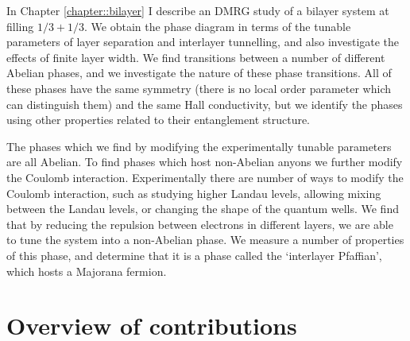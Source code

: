 In Chapter \ref{chapter::bilayer} I describe an DMRG study of a bilayer system at filling $1/3+1/3$. We obtain the phase diagram in terms of the tunable parameters of layer separation and interlayer tunnelling, and also investigate the effects of finite layer width. We find transitions between a number of different Abelian phases, and we investigate the nature of these phase transitions. All of these phases have the same symmetry (there is no local order parameter which can distinguish them) and the same Hall conductivity, but we identify the phases using other properties related to their entanglement structure.

The phases which we find by modifying the experimentally tunable parameters are all Abelian. To find phases which host non-Abelian anyons we further modify the Coulomb interaction. Experimentally there are number of ways to modify the Coulomb interaction, such as studying higher Landau levels, allowing mixing between the Landau levels, or changing the shape of the quantum wells. We find that by reducing the repulsion between electrons in different layers, we are able to tune the system into a non-Abelian phase. We measure a number of properties of this phase, and determine that it is a phase called the `interlayer Pfaffian', which hosts a Majorana fermion.






\section{Overview of contributions}

